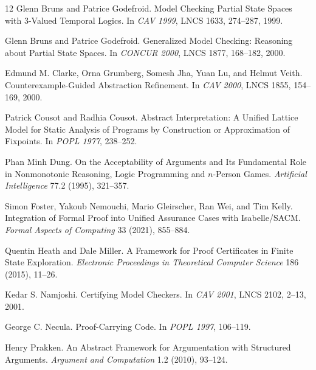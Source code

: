 \documentclass[10pt]{article}
\begin{document}
\begin{thebibliography}{12}
Glenn Bruns and Patrice Godefroid.
Model Checking Partial State Spaces with 3-Valued Temporal Logics.
In \emph{CAV 1999}, LNCS 1633, 274--287, 1999.

Glenn Bruns and Patrice Godefroid.
Generalized Model Checking: Reasoning about Partial State Spaces.
In \emph{CONCUR 2000}, LNCS 1877, 168--182, 2000.

Edmund M. Clarke, Orna Grumberg, Somesh Jha, Yuan Lu, and Helmut Veith.
Counterexample-Guided Abstraction Refinement.
In \emph{CAV 2000}, LNCS 1855, 154--169, 2000.

Patrick Cousot and Radhia Cousot.
Abstract Interpretation: A Unified Lattice Model for Static Analysis of Programs by Construction or Approximation of Fixpoints.
In \emph{POPL 1977}, 238--252.

Phan Minh Dung.
On the Acceptability of Arguments and Its Fundamental Role in Nonmonotonic Reasoning, Logic Programming and $n$-Person Games.
\emph{Artificial Intelligence} 77.2 (1995), 321--357.

Simon Foster, Yakoub Nemouchi, Mario Gleirscher, Ran Wei, and Tim Kelly.
Integration of Formal Proof into Unified Assurance Cases with Isabelle/SACM.
\emph{Formal Aspects of Computing} 33 (2021), 855--884.

Quentin Heath and Dale Miller.
A Framework for Proof Certificates in Finite State Exploration.
\emph{Electronic Proceedings in Theoretical Computer Science} 186 (2015), 11--26.

Kedar S. Namjoshi.
Certifying Model Checkers.
In \emph{CAV 2001}, LNCS 2102, 2--13, 2001.

George C. Necula.
Proof-Carrying Code.
In \emph{POPL 1997}, 106--119.

Henry Prakken.
An Abstract Framework for Argumentation with Structured Arguments.
\emph{Argument and Computation} 1.2 (2010), 93--124.
\end{thebibliography}
\end{document}
